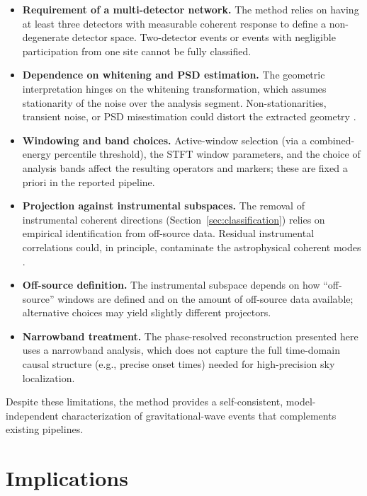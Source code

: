 \documentclass[11pt,a4paper]{article}
\begin{document}
\begin{itemize}
    \item \textbf{Requirement of a multi-detector network.} The method relies on having at least three detectors with measurable coherent response to define a non-degenerate detector space. Two-detector events or events with negligible participation from one site cannot be fully classified.

    \item \textbf{Dependence on whitening and PSD estimation.} The geometric interpretation hinges on the whitening transformation, which assumes stationarity of the noise over the analysis segment. Non-stationarities, transient noise, or PSD misestimation could distort the extracted geometry \cite{Acernese2023VirgoDetCharTools, Tolley2023ArchEnemy}.

    \item \textbf{Windowing and band choices.} Active-window selection (via a combined-energy percentile threshold), the STFT window parameters, and the choice of analysis bands affect the resulting operators and markers; these are fixed a priori in the reported pipeline.

    \item \textbf{Projection against instrumental subspaces.} The removal of instrumental coherent directions (Section~\ref{sec:classification}) relies on empirical identification from off-source data. Residual instrumental correlations could, in principle, contaminate the astrophysical coherent modes \cite{Acernese2023VirgoDetCharTools}.

    \item \textbf{Off-source definition.} The instrumental subspace depends on how ``off-source'' windows are defined and on the amount of off-source data available; alternative choices may yield slightly different projectors.

    \item \textbf{Narrowband treatment.} The phase-resolved reconstruction presented here uses a narrowband analysis, which does not capture the full time-domain causal structure (e.g., precise onset times) needed for high-precision sky localization.
\end{itemize}

Despite these limitations, the method provides a self-consistent, model-independent characterization of gravitational-wave events that complements existing pipelines.

\section{Implications}
\label{sec:implications}
\end{document}
